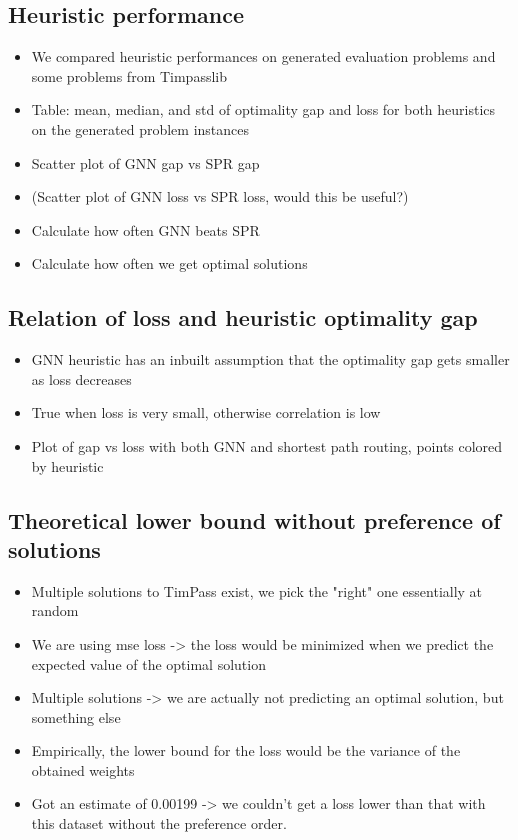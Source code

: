 \documentclass[english, 12pt, a4paper, sci, utf8, a-2b, online]{aaltothesis}
\begin{document}
\subsection{Heuristic performance}

\begin{itemize}
    \item We compared heuristic performances on generated evaluation problems and some problems from Timpasslib
    \item Table: mean, median, and std of optimality gap and loss for both heuristics on the generated problem instances
    \item Scatter plot of GNN gap vs SPR gap
    \item (Scatter plot of GNN loss vs SPR loss, would this be useful?)
    \item Calculate how often GNN beats SPR
    \item Calculate how often we get optimal solutions
\end{itemize}

\subsection{Relation of loss and heuristic optimality gap}

\begin{itemize}
    \item GNN heuristic has an inbuilt assumption that the optimality gap gets smaller as loss decreases
    \item True when loss is very small, otherwise correlation is low
    \item Plot of gap vs loss with both GNN and shortest path routing, points colored by heuristic
\end{itemize}


\subsection{Theoretical lower bound without preference of solutions}
\label{sec:solution-preference-reasoning}
\begin{itemize}
    \item Multiple solutions to TimPass exist, we pick the "right" one essentially at random
    \item We are using mse loss -> the loss would be minimized when we predict the expected value of the optimal solution
    \item Multiple solutions -> we are actually not predicting an optimal solution, but something else
    \item Empirically, the lower bound for the loss would be the variance of the obtained weights
    \item Got an estimate of 0.00199 -> we couldn't get a loss lower than that with this dataset without the preference order.
\end{itemize}
\end{document}
